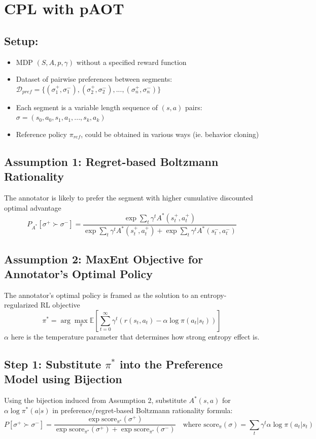 \documentclass{article}
\begin{document}
\section*{CPL with pAOT}

\subsection*{Setup:}
\begin{itemize}
    \item MDP $(S,A,p,\gamma)$ without a specified reward function
    \item Dataset of pairwise preferences between segments: $\mathcal{D}_{pref} = \{(\sigma_1^+, \sigma_1^-), (\sigma_2^+, \sigma_2^-), ..., (\sigma_n^+, \sigma_n^-)\}$
    \item Each segment is a variable length sequence of $(s, a)$ pairs: $\sigma = (s_0, a_0, s_1, a_1, ..., s_k, a_k)$
    \item Reference policy $\pi_{ref}$, could be obtained in various ways (ie. behavior cloning)
\end{itemize}

\subsection*{Assumption 1: Regret-based Boltzmann Rationality}
The annotator is likely to prefer the segment with higher cumulative discounted optimal advantage
$$P_{A^*}[\sigma^+ \succ \sigma^-] = \frac{\exp \sum_t \gamma^t A^*(s_t^+, a_t^+)}{\exp \sum_t \gamma^t A^*(s_t^+, a_t^+) + \exp \sum_t \gamma^t A^*(s_t^-, a_t^-)}$$

\subsection*{Assumption 2: MaxEnt Objective for Annotator's Optimal Policy}
The annotator's optimal policy is framed as the solution to an entropy-regularized RL objective
$$\pi^* = \arg\max_\pi \mathbb{E} \left[ \sum_{t=0}^\infty \gamma^t (r(s_t, a_t) - \alpha \log \pi(a_t|s_t)) \right]$$
$\alpha$ here is the temperature parameter that determines how strong entropy effect is.\\

\subsection*{Step 1: Substitute $\pi^*$ into the Preference Model using Bijection}
Using the bijection induced from Assumption 2, substitute $A^*(s, a)$ for $\alpha \log \pi^*(a|s)$ in preference/regret-based Boltzmann rationality formula:
$$P[\sigma^+ \succ \sigma^-] = \frac{\exp \text{score}_{\pi^*}(\sigma^+)}{\exp \text{score}_{\pi^*}(\sigma^+) + \exp \text{score}_{\pi^*}(\sigma^-)} \quad \text{where } \text{score}_\pi(\sigma) = \sum_t \gamma^t \alpha \log \pi(a_t|s_t)$$
\end{document}
